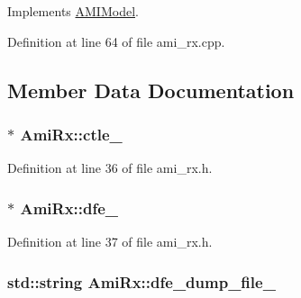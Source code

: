Implements \hyperlink{class_a_m_i_model_abb1d05835230a1b0e8f6b98002d8f4ef}{A\+M\+I\+Model}.



Definition at line 64 of file ami\+\_\+rx.\+cpp.



\subsection{Member Data Documentation}
\hypertarget{class_ami_rx_a64fc9d9aac458b2f6b398c2f7d9f7fb2}{}
\subsubsection[{ctle\+\_\+}]{$\ast$ Ami\+Rx\+::ctle\+\_\+\hspace{0.3cm}{\ttfamily [protected]}}\label{class_ami_rx_a64fc9d9aac458b2f6b398c2f7d9f7fb2}


Definition at line 36 of file ami\+\_\+rx.\+h.

\hypertarget{class_ami_rx_a68a79c0882e2c3a5bf2850578481bc2b}{}
\subsubsection[{dfe\+\_\+}]{$\ast$ Ami\+Rx\+::dfe\+\_\+\hspace{0.3cm}{\ttfamily [protected]}}\label{class_ami_rx_a68a79c0882e2c3a5bf2850578481bc2b}


Definition at line 37 of file ami\+\_\+rx.\+h.

\hypertarget{class_ami_rx_a3c8f710b6bdaedb0c35918aac0d99038}{}
\subsubsection[{dfe\+\_\+dump\+\_\+file\+\_\+}]{\setlength{\rightskip}{0pt plus 5cm}std\+::string Ami\+Rx\+::dfe\+\_\+dump\+\_\+file\+\_\+\hspace{0.3cm}{\ttfamily [protected]}}\label{class_ami_rx_a3c8f710b6bdaedb0c35918aac0d99038}


